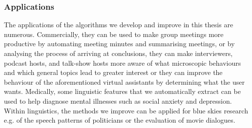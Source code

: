 \subsubsection{Applications}
The applications of the algorithms we develop and improve in this thesis are numerous. Commercially, they can be used to make group meetings more productive by automating meeting minutes and summarising meetings, or by analysing the process of arriving at conclusions\cite{daApplications}, they can make interviewers, podcast hosts, and talk-show hosts more aware of what microscopic behaviours and which general topics lead to greater interest or they can improve the behaviour of the aforementioned virtual assistants by determining what the user wants\cite{daApplications}. Medically, some linguistic features that we automatically extract can be used to help diagnose mental illnesses such as social anxiety and depression\cite{ap_psychological}. 
Within linguistics, the methods we improve can be applied for blue skies research e.g. of the speech patterns of politicians\cite{ap_trump} or the evaluation of movie dialogues\cite{movieDialogue}. \newline





%
\glsresetall